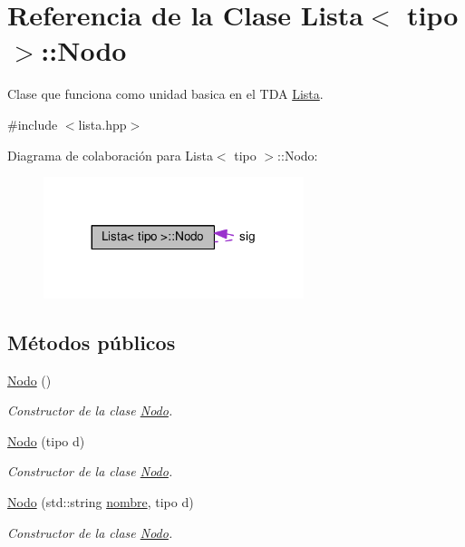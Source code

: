 \hypertarget{classLista_1_1Nodo}{}\section{Referencia de la Clase Lista$<$ tipo $>$\+:\+:Nodo}
\label{classLista_1_1Nodo}


Clase que funciona como unidad basica en el T\+DA \hyperlink{classLista}{Lista}.  




{\ttfamily \#include $<$lista.\+hpp$>$}



Diagrama de colaboración para Lista$<$ tipo $>$\+:\+:Nodo\+:\nopagebreak
\begin{figure}[H]
\begin{center}
\leavevmode
\includegraphics[width=215pt]{classLista_1_1Nodo__coll__graph}
\end{center}
\end{figure}
\subsection*{Métodos públicos}
\begin{DoxyCompactItemize}
\item 
\mbox{\label{classLista_1_1Nodo_ada58da3b483872b9b752616a4f736bfe}} 
\hyperlink{classLista_1_1Nodo_ada58da3b483872b9b752616a4f736bfe}{Nodo} ()
\begin{DoxyCompactList}\small\item\em Constructor de la clase \hyperlink{classLista_1_1Nodo}{Nodo}. \end{DoxyCompactList}\item 
\hyperlink{classLista_1_1Nodo_a76d93da356c9904873c409f413737e58}{Nodo} (tipo d)
\begin{DoxyCompactList}\small\item\em Constructor de la clase \hyperlink{classLista_1_1Nodo}{Nodo}. \end{DoxyCompactList}\item 
\hyperlink{classLista_1_1Nodo_a0ab9f1e824afe00a532fabf20ffc2607}{Nodo} (std\+::string \hyperlink{classLista_1_1Nodo_ab6ad6f5015b5e8acd5f82ca3701eb804}{nombre}, tipo d)
\begin{DoxyCompactList}\small\item\em Constructor de la clase \hyperlink{classLista_1_1Nodo}{Nodo}. \end{DoxyCompactList}\end{DoxyCompactItemize}
